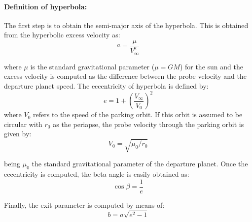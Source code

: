 \paragraph{Definition of hyperbola:}
The first step is to obtain the semi-major axis of the hyperbola. This is obtained from the hyperbolic excess velocity as:
\begin{equation}
	a = \frac{\mu}{V_\infty^2}
\end{equation}

where $\mu$ is the standard gravitational parameter ($\mu=GM$) for the sun and the excess velocity is computed as the difference between the probe velocity and the departure planet speed. The eccentricity of hyperbola is defined by:
\begin{equation}
	e=1+(\frac{V_\infty}{V_0})^2
\end{equation}
where $V_0$ refers to the speed of the parking orbit. If this orbit is assumed to be circular with $r_0$ as the periapse, the probe velocity through the parking orbit is given by:
\begin{equation}
	V_0=\sqrt{\mu_0/r_0}
\end{equation}

being $\mu_0$ the standard gravitational parameter of the departure planet. Once the eccentricity is computed, the beta angle is easily obtained as:
\begin{equation}
	\cos \beta = \frac{1}{e}
\end{equation}

Finally, the exit parameter is computed by means of:
\begin{equation}
	b=a\sqrt{e^2-1}
\end{equation}

